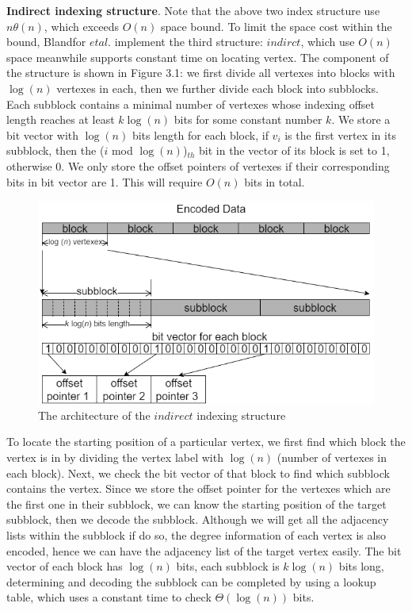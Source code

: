 \documentclass[12pt,glossary]{dalthesis}
\begin{document}
\bigskip
\bigskip

\textbf{Indirect indexing structure}. Note that the above two index structure use $n \theta (n)$, which exceeds $O(n)$ space bound. To limit the space cost within the bound, Blandfor $et al.$ implement the third structure: $indirct$, which use $O(n)$ space meanwhile supports constant time on locating vertex. The component of the structure is shown in  Figure 3.1: we first divide all vertexes into blocks with $\log(n)$ vertexes in each, then we further divide each block into subblocks. Each subblock contains a minimal number of vertexes whose indexing offset length reaches at least $k\log(n)$ bits for some constant number $k$. We store a bit vector with $\log(n)$ bits length for each block, if $v_{i}$ is the first vertex in its subblock, then the ($i$ mod $\log (n)$)$_{th}$ bit in the vector of its block is set to 1, otherwise 0. We only store the offset pointers of vertexes if their corresponding bits in bit vector are 1. This will require $O(n)$ bits in total. 

\bigskip

\begin{figure}[ht]
\centering
\includegraphics[width=1.0\textwidth]{indirect}
\caption{The architecture of the $indirect$ indexing structure}
\end{figure}

\bigskip

To locate the starting position of a particular vertex, we first find which block the vertex is in by dividing the vertex label with $\log(n)$ (number of vertexes in each block). Next, we check the bit vector of that block to find which subblock contains the vertex. Since we store the offset pointer for the vertexes which are the first one in their subblock, we can know the starting position of the target subblock, then we decode the subblock. Although we will get all the adjacency lists within the subblock if do so, the degree information of each vertex is also encoded, hence we can have the adjacency list of the target vertex easily. The bit vector of each block has $\log(n)$ bits, each subblock is $k\log(n)$ bits long, determining and decoding the subblock can be completed by using a lookup table, which uses a constant time to check $\Theta(\log(n))$ bits.              
\end{document}
